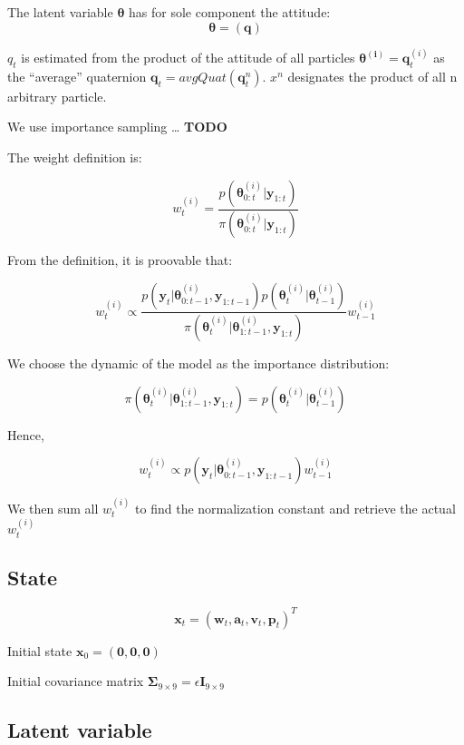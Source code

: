 \documentclass[]{article}
\begin{document}
The latent variable \(\boldsymbol{\theta}\) has for sole component the
attitude: \[\boldsymbol{\theta} = (\mathbf{q})\]

\(q_t\) is estimated from the product of the attitude of all particles
\(\mathbf{\theta^{(i)}} = \mathbf{q}^{(i)}_t\) as the ``average''
quaternion \(\mathbf{q}_t = avgQuat(\mathbf{q}^n_t)\). \(x^n\)
designates the product of all n arbitrary particle.

We use importance sampling \ldots{} \textbf{TODO}

The weight definition is:

\[w^{(i)}_t = \frac{p(\boldsymbol{\theta}^{(i)}_{0:t} | \mathbf{y}_{1:t})}{\pi(\boldsymbol{\theta}^{(i)}_{0:t} | \mathbf{y}_{1:t})}\]

From the definition, it is proovable that:

\[w^{(i)}_t \propto \frac{p(\mathbf{y}_t | \boldsymbol{\theta}^{(i)}_{0:t-1}, \mathbf{y}_{1:t-1})p(\boldsymbol{\theta}^{(i)}_t | \boldsymbol{\theta}^{(i)}_{t-1})}{\pi(\boldsymbol{\theta}^{(i)}_t | \boldsymbol{\theta}^{(i)}_{1:t-1}, \mathbf{y}_{1:t})} w^{(i)}_{t-1}\]

We choose the dynamic of the model as the importance distribution:

\[\pi(\boldsymbol{\theta}^{(i)}_t | \boldsymbol{\theta}^{(i)}_{1:t-1}, \mathbf{y}_{1:t}) = p(\boldsymbol{\theta}^{(i)}_t | \boldsymbol{\theta}^{(i)}_{t-1}) \]

Hence,

\[w^{(i)}_t \propto p(\mathbf{y}_t | \boldsymbol{\theta}^{(i)}_{0:t-1}, \mathbf{y}_{1:t-1}) w^{(i)}_{t-1}\]

We then sum all \(w^{(i)}_t\) to find the normalization constant and
retrieve the actual \(w^{(i)}_t\)

\subsection{State}\label{state-1}

\[\mathbf{x}_t = (\mathbf{w}_t, \mathbf{a}_t, \mathbf{v}_t, \mathbf{p}_t)^T\]

Initial state \(\mathbf{x}_0 = (\mathbf{0}, \mathbf{0}, \mathbf{0})\)

Initial covariance matrix
\(\mathbf{\Sigma}_{9 \times 9} = \epsilon \mathbf{I}_{9 \times 9}\)

\subsection{Latent variable}\label{latent-variable}
\end{document}
